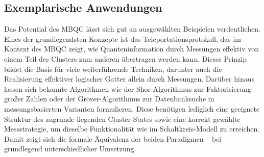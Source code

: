 \subsection*{Exemplarische Anwendungen}
Das Potential des MBQC lässt sich gut an ausgewählten Beispielen verdeutlichen. Eines der grundlegendsten Konzepte ist das Teleportationsprotokoll, das im Kontext des MBQC zeigt, wie Quanteninformation durch Messungen effektiv von einem Teil des Clusters zum anderen übertragen werden kann. Dieses Prinzip bildet die Basis für viele weiterführende Techniken, darunter auch die Realisierung effektiver logischer Gatter allein durch Messungen.
Darüber hinaus lassen sich bekannte Algorithmen wie der Shor-Algorithmus zur Faktorisierung großer Zahlen oder der Grover-Algorithmus zur Datenbanksuche in messungsbasierten Varianten formulieren. Diese benötigen lediglich eine geeignete Struktur des zugrunde liegenden Cluster-States sowie eine korrekt gewählte Messstrategie, um dieselbe Funktionalität wie im Schaltkreis-Modell zu erreichen. Damit zeigt sich die formale Äquivalenz der beiden Paradigmen – bei grundlegend unterschiedlicher Umsetzung.

